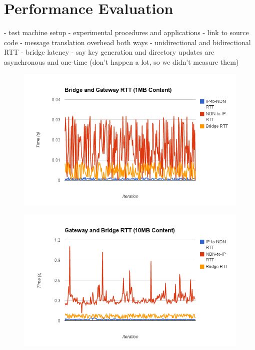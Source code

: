\section{Performance Evaluation}

- test machine setup
- experimental procedures and applications
- link to source code
- message translation overhead both ways
- unidirectional and bidirectional RTT
- bridge latency
- say key generation and directory updates are asynchronous and one-time (don't happen a lot, so we didn't measure them)


\begin{figure}
\begin{center}
\includegraphics[scale=0.3]{./images/small.png}
\end{center}
\end{figure}

\begin{figure}
\begin{center}
\includegraphics[scale=0.3]{./images/large.png}
\end{center}
\end{figure}

